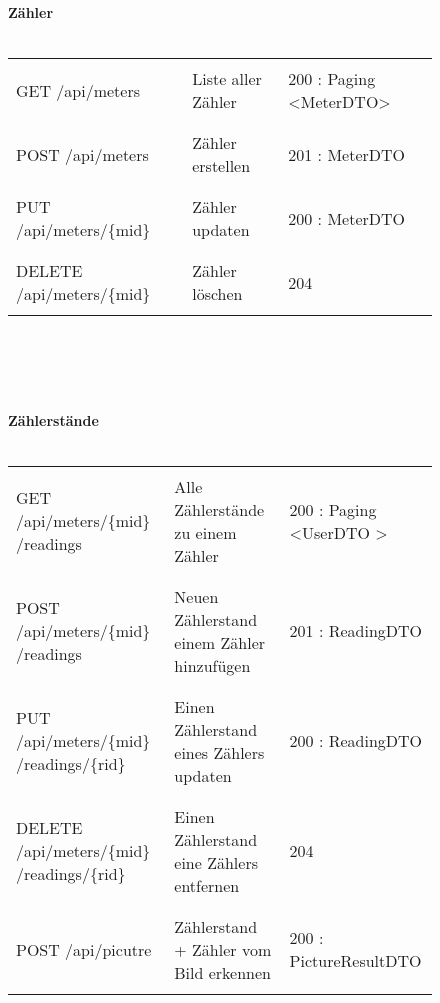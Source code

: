 \begin{figure}[H]
	\textbf {Zähler} \\ \\
	\begin{tabularx}{\textwidth}{X | X | X}
		\hline \\
		GET 	/api/meters & Liste aller Zähler & 200 : Paging \textless MeterDTO\textgreater \\ \\ \hline
		\\ POST /api/meters & Zähler erstellen & 201 : MeterDTO\\ \\ \hline
		\\  PUT /api/meters/\{mid\} & Zähler updaten & 200 : MeterDTO \\ \\ \hline
		\\ DELETE	/api/meters/\{mid\} & Zähler löschen & 204 \\ \\ \hline
	\end{tabularx}
\\ \\ \\ \\

	\textbf{Zählerstände} \\ \\
	\begin{tabularx}{\textwidth}{X | X | X}
		\hline \\
		GET	/api/meters/\{mid\} /readings & Alle Zählerstände zu einem Zähler & 200 : Paging \textless UserDTO \textgreater \\ \\ \hline
	\\ 	POST /api/meters/\{mid\} /readings & Neuen Zählerstand einem Zähler hinzufügen & 201 : ReadingDTO\\ \\ \hline
	\\	PUT /api/meters/\{mid\} /readings/\{rid\} & Einen Zählerstand eines Zählers updaten & 200 : ReadingDTO \\ \\ \hline
	\\	DELETE /api/meters/\{mid\} /readings/\{rid\} & Einen Zählerstand eine Zählers entfernen & 204 \\ \\   \hline
	\\	POST /api/picutre & Zählerstand + Zähler vom Bild erkennen & 200 : PictureResultDTO \\ \\ \hline
	\end{tabularx}

\end{figure}

